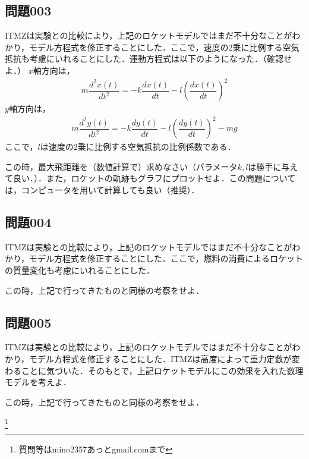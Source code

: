 \documentclass[12pt]{jarticle}
\begin{document}
\subsection*{問題003}
ITMZは実験との比較により，上記のロケットモデルではまだ不十分なことがわかり，モデル方程式を修正することにした．ここで，速度の2乗に比例する空気抵抗も考慮にいれることにした．運動方程式は以下のようになった．（確認せよ．）
$x$軸方向は，
\begin{align*}
m \dfrac{d^2 x(t)}{dt^2} = - k \dfrac{dx(t)}{dt} - l \left( \dfrac{dx(t)}{dt} \right)^2 
\end{align*}
$y$軸方向は，
\begin{align*}
m \dfrac{d^2 y(t)}{dt^2} = - k \dfrac{dy(t)}{dt} - l \left( \dfrac{dy(t)}{dt} \right)^2  - mg
\end{align*}
ここで，$l$は速度の2乗に比例する空気抵抗の比例係数である．

この時，最大飛距離を（数値計算で）求めなさい（パラメータ$k, l$は勝手に与えて良い．）．また，ロケットの軌跡もグラフにプロットせよ．この問題については，コンピュータを用いて計算しても良い（推奨）．
%
\subsection*{問題004}
ITMZは実験との比較により，上記のロケットモデルではまだ不十分なことがわかり，モデル方程式を修正することにした．ここで，燃料の消費によるロケットの質量変化も考慮にいれることにした．

この時，上記で行ってきたものと同様の考察をせよ．
%
\subsection*{問題005}
ITMZは実験との比較により，上記のロケットモデルではまだ不十分なことがわかり，モデル方程式を修正することにした．ITMZは高度によって重力定数が変わることに気づいた．そのもとで，上記ロケットモデルにこの効果を入れた数理モデルを考えよ．

この時，上記で行ってきたものと同様の考察をせよ．


\footnote[0]{
質問等はmino2357あっとgmail.comまで
}

\thispagestyle{empty}
\end{document}
